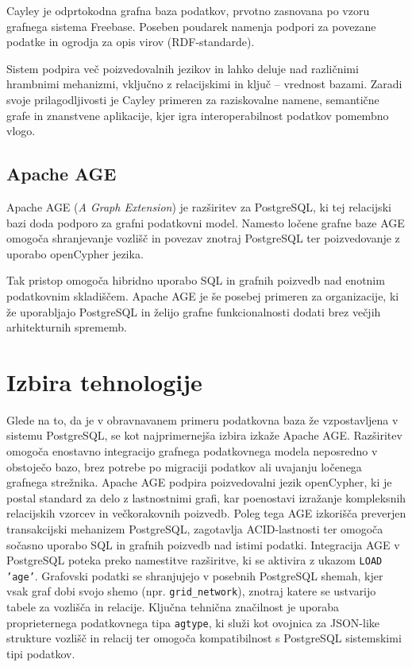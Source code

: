 \documentclass[a4paper,12pt,openright]{book}
\begin{document}
Cayley je odprtokodna grafna baza podatkov, prvotno zasnovana po vzoru grafnega sistema Freebase. Poseben poudarek namenja podpori za povezane podatke in ogrodja za opis virov (RDF-standarde).

Sistem podpira več poizvedovalnih jezikov in lahko deluje nad različnimi hrambnimi mehanizmi, vključno z relacijskimi in ključ – vrednost bazami. Zaradi svoje prilagodljivosti je Cayley primeren za raziskovalne namene, semantične grafe in znanstvene aplikacije, kjer igra interoperabilnost podatkov pomembno vlogo.

\subsection{Apache AGE}

Apache AGE (\emph{A Graph Extension}) je razširitev za PostgreSQL, ki tej relacijski bazi doda podporo za grafni podatkovni model. Namesto ločene grafne baze AGE omogoča shranjevanje vozlišč in povezav znotraj PostgreSQL ter poizvedovanje z uporabo openCypher jezika.

Tak pristop omogoča hibridno uporabo SQL in grafnih poizvedb nad enotnim podatkovnim skladiščem. Apache AGE je še posebej primeren za organizacije, ki že uporabljajo PostgreSQL in želijo grafne funkcionalnosti dodati brez večjih arhitekturnih sprememb.

\section{Izbira tehnologije}

Glede na to, da je v obravnavanem primeru podatkovna baza že vzpostavljena v sistemu PostgreSQL, se kot najprimernejša izbira izkaže Apache AGE. Razširitev omogoča enostavno integracijo grafnega podatkovnega modela neposredno v obstoječo bazo, brez potrebe po migraciji podatkov ali uvajanju ločenega grafnega strežnika. Apache AGE podpira poizvedovalni jezik openCypher, ki je postal standard za delo z lastnostnimi grafi, kar poenostavi izražanje kompleksnih relacijskih vzorcev in večkorakovnih poizvedb. Poleg tega AGE izkorišča preverjen transakcijski mehanizem PostgreSQL, zagotavlja ACID-lastnosti ter omogoča sočasno uporabo SQL in grafnih poizvedb nad istimi podatki. Integracija AGE v PostgreSQL poteka preko namestitve razširitve, ki se aktivira z ukazom \texttt{LOAD 'age'}. Grafovski podatki se shranjujejo v posebnih PostgreSQL shemah, kjer vsak graf dobi svojo shemo (npr. \texttt{grid\_network}), znotraj katere se ustvarijo tabele za vozlišča in relacije. Ključna tehnična značilnost je uporaba proprieternega podatkovnega tipa \texttt{agtype}, ki služi kot ovojnica za JSON-like strukture vozlišč in relacij ter omogoča kompatibilnost s PostgreSQL sistemskimi tipi podatkov.
\end{document}
